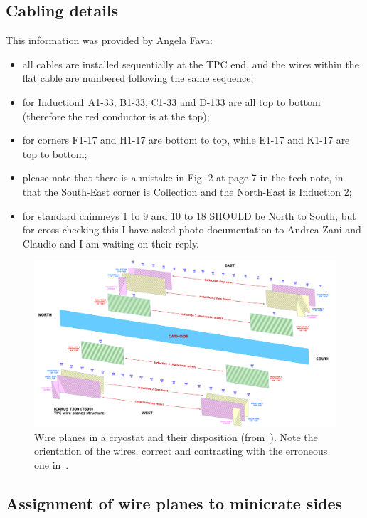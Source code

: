 \documentclass{article}
\begin{document}
\subsection{Cabling details}
\label{ssec:CablingInfo}

This information was provided by Angela Fava:
\begin{itemize}
  \item all cables are installed sequentially at the TPC end, and the wires within the flat cable are numbered following the same sequence;
  \item for Induction1 A1-33, B1-33, C1-33 and D-133 are all top to bottom (therefore the red conductor is at the top);
  \item for corners F1-17 and H1-17 are bottom to top, while E1-17 and K1-17 are top to bottom;
  \item please note that there is a mistake in Fig. 2 at page 7 in the tech note, in that the South-East corner is Collection and the North-East is Induction 2;
  \item for standard chimneys 1 to 9 and 10 to 18 SHOULD be North to South, but for cross-checking this I have asked photo documentation to Andrea Zani and Claudio and I am waiting on their reply.
\end{itemize}


\begin{figure}[p]
  \includegraphics[width=\linewidth]{figures/Icarus_TPC_wp}
  \caption{
    Wire planes in a cryostat and their disposition (from~\cite{SBNDocDBxxxx}).
    Note the orientation of the wires, correct and contrasting with the erroneous one in~\cite{SBNDocDB1020}.
    \label{fig:WirePlanesInTPC}
  }
\end{figure}

\subsection{Assignment of wire planes to minicrate sides}
\label{ssec:PlaneAssignment}
\end{document}
